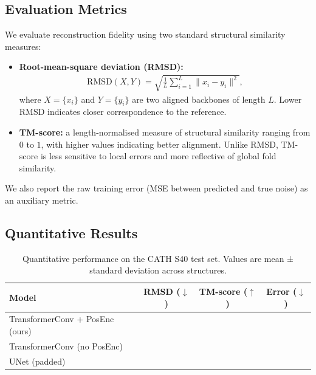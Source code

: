 \documentclass[a4paper,12pt]{article}
\begin{document}
\subsection{Evaluation Metrics}\label{subsec:metrics}
We evaluate reconstruction fidelity using two standard structural similarity measures:
\begin{itemize}
    \item \textbf{Root-mean-square deviation (RMSD):}
        \begin{align*}
            \mathrm{RMSD}(X, Y) = \sqrt{\frac{1}{L}\sum_{i=1}^{L} \|x_i - y_i\|^2},
        \end{align*}
        where \(X=\{x_i\}\) and \(Y=\{y_i\}\) are two aligned backbones of length \(L\). Lower RMSD indicates closer correspondence to the reference.
    \item \textbf{TM-score:} a length-normalised measure of structural similarity ranging from \(0\) to \(1\), with higher values indicating better alignment. Unlike RMSD, TM-score is less sensitive to local errors and more reflective of global fold similarity.
\end{itemize}

We also report the raw training error (MSE between predicted and true noise) as an auxiliary metric.

\subsection{Quantitative Results}\label{subsec:results}

\begin{table}[htbp]
\centering
\caption{Quantitative performance on the CATH S40 test set. Values are mean ± standard deviation across structures.}
\label{tab:results}
\begin{tabular}{lccc}
\hline
Model & RMSD (\(\downarrow\)) & TM-score (\(\uparrow\)) & Error (\(\downarrow\)) \\
\hline
TransformerConv + PosEnc (ours) &   &   &   \\
TransformerConv (no PosEnc)     &   &   &   \\
UNet (padded)                   &   &   &   \\
\hline
\end{tabular}
\end{table}
\end{document}
